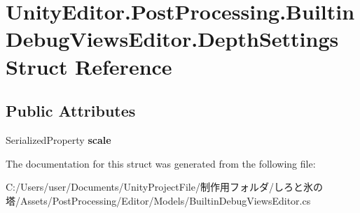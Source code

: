 \hypertarget{struct_unity_editor_1_1_post_processing_1_1_builtin_debug_views_editor_1_1_depth_settings}{}\section{Unity\+Editor.\+Post\+Processing.\+Builtin\+Debug\+Views\+Editor.\+Depth\+Settings Struct Reference}
\label{struct_unity_editor_1_1_post_processing_1_1_builtin_debug_views_editor_1_1_depth_settings}
\subsection*{Public Attributes}
\begin{DoxyCompactItemize}
\item 
\mbox{\label{struct_unity_editor_1_1_post_processing_1_1_builtin_debug_views_editor_1_1_depth_settings_a891084110084c6ec6f1563828c288a3b}} 
Serialized\+Property {\bfseries scale}
\end{DoxyCompactItemize}


The documentation for this struct was generated from the following file\+:\begin{DoxyCompactItemize}
\item 
C\+:/\+Users/user/\+Documents/\+Unity\+Project\+File/制作用フォルダ/しろと氷の塔/\+Assets/\+Post\+Processing/\+Editor/\+Models/Builtin\+Debug\+Views\+Editor.\+cs\end{DoxyCompactItemize}
